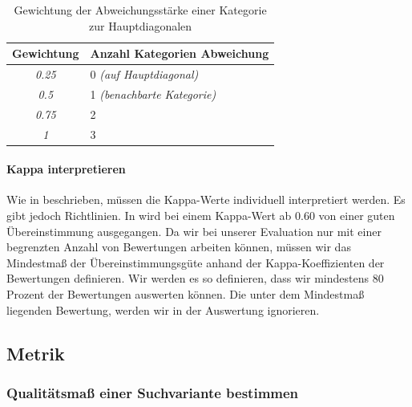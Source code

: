 \begin{table}[H]
\centering
\vspace{-.5em}
\caption[Gewichtung der Abweichungsstärke einer Kategorie zur Hauptdiagonalen]{Gewichtung der Abweichungsstärke einer Kategorie zur Hauptdiagonalen}
\label{tab:GewichtungAbweichungenKappaBerechnung}
\vspace{-.5em}
\footnotesize
\renewcommand*{\arraystretch}{1.2}
\begin{tabular}{cl}
\hline
\multicolumn{1}{l}{\textbf{Gewichtung}} & \textbf{Anzahl Kategorien Abweichung} \\ \hline
\textit{0.25}                                     & 0 \textit{(auf Hauptdiagonal)}                 \\ 
\textit{0.5}                                      & 1 \textit{(benachbarte Kategorie)}             \\ 
\textit{0.75}                                     & 2                                     \\ 
\textit{1}                                        & 3                                     \\ \hline
\end{tabular}
\vspace{-1.5em}
\end{table}

\paragraph{Kappa interpretieren}

Wie in \cite{KappaWerte} beschrieben, müssen die Kappa-Werte individuell interpretiert werden. Es gibt jedoch Richtlinien. In \cite{Kappa} wird bei einem Kappa-Wert ab 0.60 von einer guten Übereinstimmung ausgegangen. Da wir bei unserer Evaluation nur mit einer begrenzten Anzahl von Bewertungen arbeiten können, müssen wir das Mindestmaß der Übereinstimmungsgüte anhand der Kappa-Koeffizienten der Bewertungen definieren. Wir werden es so definieren, dass wir mindestens 80 Prozent der Bewertungen auswerten können. Die unter dem Mindestmaß liegenden Bewertung, werden wir in der Auswertung ignorieren. 

\subsection{Metrik}
\label{sec:Evaluation:Aufbau:Metrik}

\subsubsection{Qualitätsmaß einer Suchvariante bestimmen}
\label{sec:Evaluation:Aufbau:Metrik:QualitaetMessen}

